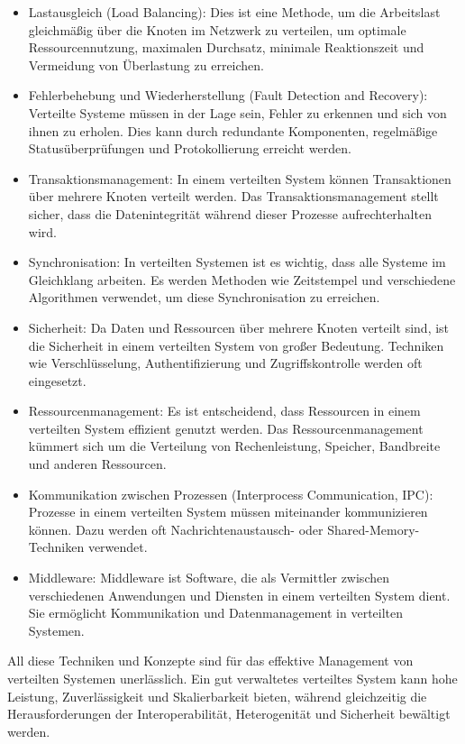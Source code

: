 \documentclass[../vs-script-first-v01.tex]{subfiles}
\begin{document}
\begin{itemize} 
\item Lastausgleich (Load Balancing): Dies ist eine Methode, um die Arbeitslast gleichmäßig über die Knoten im Netzwerk zu verteilen, um optimale Ressourcennutzung, maximalen Durchsatz, minimale Reaktionszeit und Vermeidung von Überlastung zu erreichen.
\item Fehlerbehebung und Wiederherstellung (Fault Detection and Recovery): Verteilte Systeme müssen in der Lage sein, Fehler zu erkennen und sich von ihnen zu erholen. Dies kann durch redundante Komponenten, regelmäßige Statusüberprüfungen und Protokollierung erreicht werden.
\item Transaktionsmanagement: In einem verteilten System können Transaktionen über mehrere Knoten verteilt werden. Das Transaktionsmanagement stellt sicher, dass die Datenintegrität während dieser Prozesse aufrechterhalten wird.
\item Synchronisation: In verteilten Systemen ist es wichtig, dass alle Systeme im Gleichklang arbeiten. Es werden Methoden wie Zeitstempel und verschiedene Algorithmen verwendet, um diese Synchronisation zu erreichen.
\item Sicherheit: Da Daten und Ressourcen über mehrere Knoten verteilt sind, ist die Sicherheit in einem verteilten System von großer Bedeutung. Techniken wie Verschlüsselung, Authentifizierung und Zugriffskontrolle werden oft eingesetzt.
\item Ressourcenmanagement: Es ist entscheidend, dass Ressourcen in einem verteilten System effizient genutzt werden. Das Ressourcenmanagement kümmert sich um die Verteilung von Rechenleistung, Speicher, Bandbreite und anderen Ressourcen.
\item Kommunikation zwischen Prozessen (Interprocess Communication, IPC): Prozesse in einem verteilten System müssen miteinander kommunizieren können. Dazu werden oft Nachrichtenaustausch- oder Shared-Memory-Techniken verwendet.
\item Middleware: Middleware ist Software, die als Vermittler zwischen verschiedenen Anwendungen und Diensten in einem verteilten System dient. Sie ermöglicht Kommunikation und Datenmanagement in verteilten Systemen.
\end{itemize} 
All diese Techniken und Konzepte sind für das effektive Management von verteilten Systemen unerlässlich. Ein gut verwaltetes verteiltes System kann hohe Leistung, Zuverlässigkeit und Skalierbarkeit bieten, während gleichzeitig die Herausforderungen der Interoperabilität, Heterogenität und Sicherheit bewältigt werden.
\end{document}
